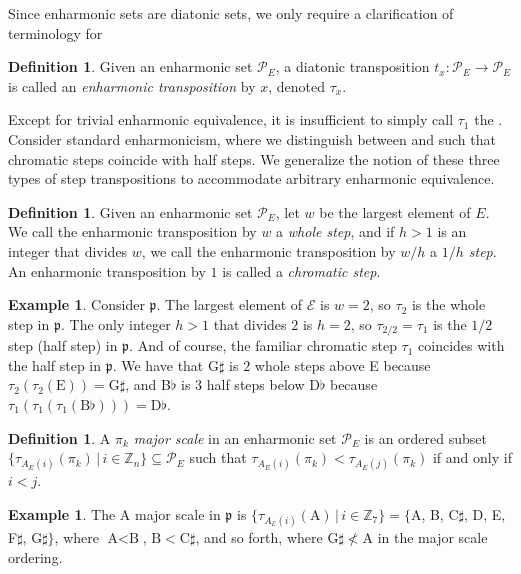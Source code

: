 \documentclass{article}
\theoremstyle{plain}
\theoremstyle{definition}
\newtheorem{definition}[theorem]{Definition}
\newtheorem{example}[theorem]{Example}
\theoremstyle{remark}
\begin{document}
Since enharmonic sets are diatonic sets, we only require a clarification of terminology for 

\begin{definition}
	Given an enharmonic set $\mathcal{P}_E$, a diatonic transposition $t_x:\mathcal{P}_E\to\mathcal{P}_E$ is called an \textit{enharmonic transposition} by $x$, denoted $\tau_x$.
\end{definition}

Except for trivial enharmonic equivalence, it is insufficient to simply call $\tau_1$ the . Consider standard enharmonicism, where we distinguish between   and  such that chromatic steps coincide with half steps. We generalize the notion of these three types of step transpositions to accommodate arbitrary enharmonic equivalence.

\begin{definition}
\label{DEF.Enharmonic Step Types}
	Given an enharmonic set $\mathcal{P}_E$, let $w$ be the largest element of $E$. We call the enharmonic transposition by $w$ a \textit{whole step}, and if $h>1$ is an integer that divides $w$, we call the enharmonic transposition by $w/h$ a \textit{$1/h$ step}. An enharmonic transposition by $1$ is called a \textit{chromatic step}.
\end{definition}

\begin{example}
	Consider $\mathfrak{p}$. The largest element of $\mathcal{E}$ is $w=2$, so $\tau_2$ is the whole step in $\mathfrak{p}$. The only integer $h>1$ that divides $2$ is $h=2$, so $\tau_{2/2}=\tau_1$ is the $1/2$ step (half step) in $\mathfrak{p}$. And of course, the familiar chromatic step $\tau_1$ coincides with the half step in $\mathfrak{p}$. We have that G$\sharp$ is $2$ whole steps above E because $\tau_2(\tau_2(\textrm{E}))=\textrm{G}\sharp$, and B$\flat$ is $3$ half steps below D$\flat$ because $\tau_1(\tau_1(\tau_1(\textrm{B}\flat)))=\textrm{D}\flat$.
\end{example}

\begin{definition}
	A \textit{$\pi_k$ major scale} in an enharmonic set $\mathcal{P}_E$ is an ordered subset $\{\tau_{A_E(i)}(\pi_k)\,|\,i\in\mathbb{Z}_n\}\subseteq\mathcal{P}_E$ such that $\tau_{A_E(i)}(\pi_k)<\tau_{A_E(j)}(\pi_k)$ if and only if $i<j$.
\end{definition}

\begin{example}
	The A major scale in $\mathfrak{p}$ is $\{\tau_{A_\mathcal{E}(i)}(\textrm{A})\,|\,i\in\mathbb{Z}_7\}=\{\textrm{A}$, B, C$\sharp$, D, E, F$\sharp$, G$\sharp\}$, where $\textrm{A}<\textrm{B}$, $\textrm{B}<\textrm{C}\sharp$, and so forth, where $\textrm{G}\sharp\not<\textrm{A}$ in the major scale ordering.
\end{example}
\end{document}
